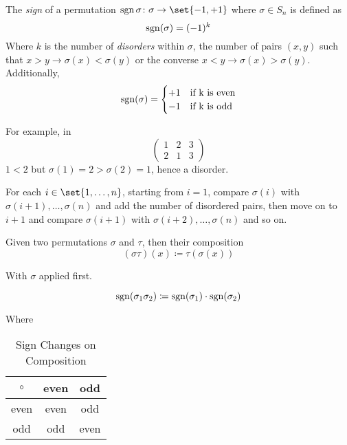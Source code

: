 \begin{definition}
    The \textit{sign} of a permutation $\Sign{\sigma} \colon \sigma \to \set{-1, +1}$ where $\sigma \in S_n$ is defined as
    \begin{equation}
        \operatorname{sgn}(\sigma) = (-1)^{k}
    \end{equation}
    Where $k$ is the number of \textit{disorders} within $\sigma$, the number of pairs $(x, y)$ such that $x > y \to \sigma(x) < \sigma(y)$ or the converse $x < y \to \sigma(x) > \sigma(y)$. Additionally,
    \begin{equation}
        \operatorname{sgn}(\sigma) = \begin{cases}
            +1 &\text{if k is even} \\
            -1 &\text{if k is odd}
        \end{cases}
    \end{equation}
\end{definition}

\begin{remark}
    For example, in
    \begin{equation*}
        \begin{pmatrix}
            1 & 2 & 3 \\
            2 & 1 & 3
        \end{pmatrix}
    \end{equation*}
    $1 < 2$ but $\sigma(1) = 2 > \sigma(2) = 1$, hence a disorder.
    
    For each $i \in \set{1, \dots, n}$, starting from $i = 1$, compare $\sigma(i)$ with $\sigma(i + 1), \dots, \sigma(n)$ and add the number of disordered pairs, then move on to $i + 1$ and compare $\sigma(i + 1)$ with $\sigma(i + 2), \dots, \sigma(n)$ and so on.
\end{remark}

\begin{definition}
    Given two permutations $\sigma$ and $\tau$, then their composition
    \begin{equation}
        (\sigma \tau) (x) \coloneqq \tau(\sigma(x))
    \end{equation}
    
    With $\sigma$ applied first.
\end{definition}

\begin{theorem}
	\begin{equation}
		\operatorname{sgn}(\sigma_1 \sigma_2) \coloneqq \operatorname{sgn}(\sigma_1) \cdot \operatorname{sgn}(\sigma_2)
	\end{equation}
\end{theorem}

Where
\begin{table}[H]
\centering
\begin{tabular}{c | c c}
\toprule
$\circ$ & even & odd  \\
\midrule
even    & even & odd  \\
odd     & odd  & even \\
\bottomrule
\end{tabular}
\caption{Sign Changes on Composition}
\end{table}
